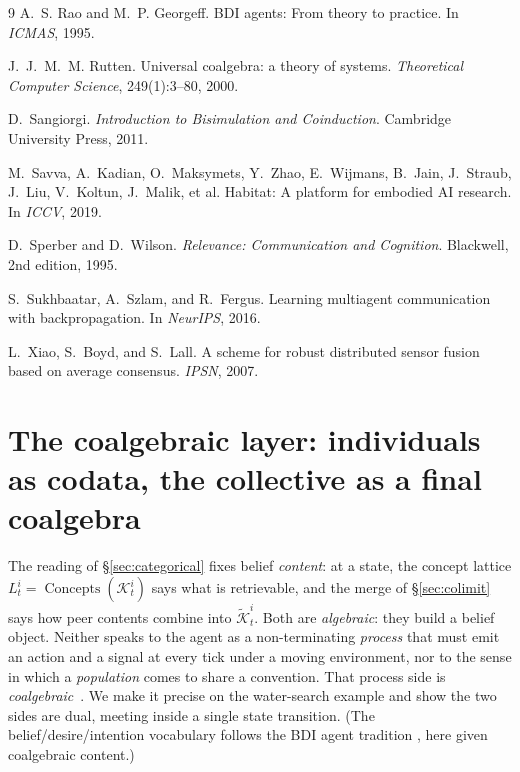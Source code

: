 \documentclass{article}
\begin{document}
{\begin{thebibliography}{9}
A.~S. Rao and M.~P. Georgeff.
\newblock BDI agents: From theory to practice.
\newblock In \emph{ICMAS}, 1995.

J.~J.~M.~M. Rutten.
\newblock Universal coalgebra: a theory of systems.
\newblock \emph{Theoretical Computer Science}, 249(1):3--80, 2000.

D.~Sangiorgi.
\newblock \emph{Introduction to Bisimulation and Coinduction}.
\newblock Cambridge University Press, 2011.

M.~Savva, A.~Kadian, O.~Maksymets, Y.~Zhao, E.~Wijmans, B.~Jain, J.~Straub, J.~Liu, V.~Koltun, J.~Malik, et al.
\newblock Habitat: A platform for embodied AI research.
\newblock In \emph{ICCV}, 2019.

D.~Sperber and D.~Wilson.
\newblock \emph{Relevance: Communication and Cognition}.
\newblock Blackwell, 2nd edition, 1995.

S.~Sukhbaatar, A.~Szlam, and R.~Fergus.
\newblock Learning multiagent communication with backpropagation.
\newblock In \emph{NeurIPS}, 2016.

L.~Xiao, S.~Boyd, and S.~Lall.
\newblock A scheme for robust distributed sensor fusion based on average consensus.
\newblock \emph{IPSN}, 2007.

\end{thebibliography}
}

\appendix

\section{The coalgebraic layer: individuals as codata, the collective as a final coalgebra}
\label{sec:coalgebra}

The reading of \S\ref{sec:categorical} fixes belief \emph{content}: at a
state, the concept lattice $L_t^i=\operatorname{Concepts}(\mathcal{K}_t^i)$
says what is retrievable, and the merge of \S\ref{sec:colimit} says how peer
contents combine into $\widetilde{\mathcal K}_t^i$. Both are
\emph{algebraic}: they build a belief object. Neither speaks to the agent as
a non-terminating \emph{process} that must emit an action and a signal at
every tick under a moving environment, nor to the sense in which a
\emph{population} comes to share a convention. That process side is
\emph{coalgebraic}~\citep{rutten2000universal,jacobs2016coalgebra}. We make it precise on the water-search example and show
the two sides are dual, meeting inside a single state transition. (The
belief/desire/intention vocabulary follows the BDI agent tradition
\citep{rao1995bdi}, here given coalgebraic content.)
\end{document}

